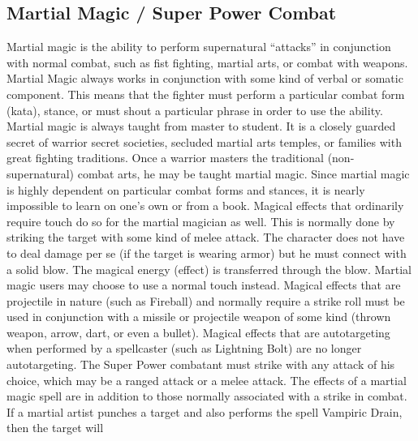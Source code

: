 \documentclass[twoside]{book}
\begin{document}
\subsection{Martial Magic / Super Power Combat}
      Martial magic is the ability to perform
               supernatural “attacks” in conjunction with
               normal combat, such as fist fighting, martial arts, or
               combat with weapons.   Martial Magic always works in conjunction with some
               kind of verbal or somatic component. This means that the
               fighter must perform a particular combat form (kata),
               stance, or must shout a particular phrase in order to use
               the ability.   Martial magic is always taught from master to
               student. It is a closely guarded secret of warrior secret
               societies, secluded martial arts temples, or families with
               great fighting traditions. Once a warrior masters the
               traditional (non-supernatural) combat arts, he may be
               taught martial magic. Since martial magic is highly
               dependent on particular combat forms and stances, it is
               nearly impossible to learn on one’s own or from a
               book.   Magical effects that ordinarily require touch do so
               for the martial magician as well. This is normally done by
               striking the target with some kind of melee attack. The
               character does not have to deal damage per se (if the
               target is wearing armor) but he must connect with a solid
               blow. The magical energy (effect) is transferred through
               the blow. Martial magic users may choose to use a normal
               touch instead.   Magical effects that are projectile in nature (such
               as Fireball) and normally require a strike roll must be
               used in conjunction with a missile or projectile weapon of
               some kind (thrown weapon, arrow, dart, or even a bullet).
                 Magical effects that are autotargeting when
               performed by a spellcaster (such as Lightning Bolt) are no
               longer autotargeting. The Super Power combatant must
               strike with any attack of his choice, which may be a
               ranged attack or a melee attack.   The effects of a martial magic spell are in
               addition to those normally associated with a strike in
               combat. If a martial artist punches a target and also
               performs the spell Vampiric Drain, then the target will
\end{document}
